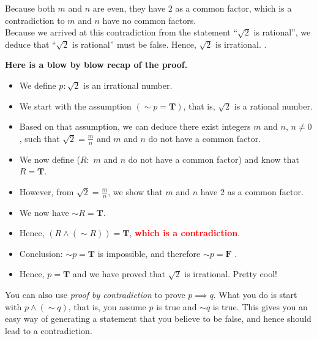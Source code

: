 Because both $m$ and $n$ are even, they have $2$ as a common factor, which is a contradiction to $m$ and $n$ have no common factors. \\

Because we arrived at this contradiction from the statement ``$\sqrt{2}$ is rational'', we deduce that ``$\sqrt{2}$ is rational'' must be false. Hence, $\sqrt{2}$ is irrational.
\Qed.

\vspace*{.2in}

\textbf{Here is a blow by blow recap of the proof.} 
\begin{itemize}
    \item We define $p: \sqrt{2}$ is an irrational number.

\item  We start with the assumption $(\sim p = \textbf{T})$, that is, $\sqrt{2}$ is a rational number.
\item  Based on that assumption, we can deduce there exist integers $m$ and $n$, $n\neq 0$,  such that $\sqrt{2}=\frac{m}{n}$ and $m$ and $n$ do not have a common factor.
\item We now define ($R:$ $m$ and $n$ do not have a common factor) and know that $R = \textbf{T}$.
\item  However, from $\sqrt{2}=\frac{m}{n}$, we show that $m$ and $n$ have 2 as a common factor.
\item We now have $\sim R = \textbf{T}$.
\item Hence,  $ (R \land (\sim R)) = \textbf{T}$, \textcolor{red}{\bf which is a contradiction}.
\item  Conclusion: $\sim p = \textbf{T}$ is impossible, and therefore $\sim p = \textbf{F}$ .
\item  Hence, $p = \textbf{T}$ and we have proved that $\sqrt{2}$ is irrational. Pretty cool!
  \end{itemize}
  
\begin{rem}
You can also use \emph{proof by contradiction} to prove $p \implies q$. What you do is start with $p \land (\sim q)$, that is, you assume $p$ is true and $\sim q$ is true. This gives you an easy way of generating a statement that you believe to be false, and hence should lead to a contradiction. 
\end{rem}
  
  
  
